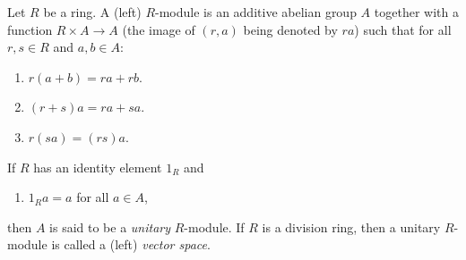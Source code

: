 Let $R$ be a ring. A (left) $R$-module is an additive abelian group $A$ together with a function $R \times A \to A$ (the image of $(r,a)$ being denoted by $ra$) such that for all $r,s \in R$ and $a,b \in A$:
\begin{enumerate}
\item[(i)] $r(a + b) = ra + rb$.
\item[(ii)] $(r + s)a = ra + sa$.
\item[(iii)] $r(sa) = (rs)a$.
\end{enumerate}
If $R$ has an identity element $1_R$ and
\begin{enumerate}
\item[(iv)] $1_R a = a$ for all $a \in A$,
\end{enumerate}
then $A$ is said to be a \emph{unitary} $R$-module. If $R$ is a division ring, then a unitary $R$-module is called a (left) \emph{vector space}.
